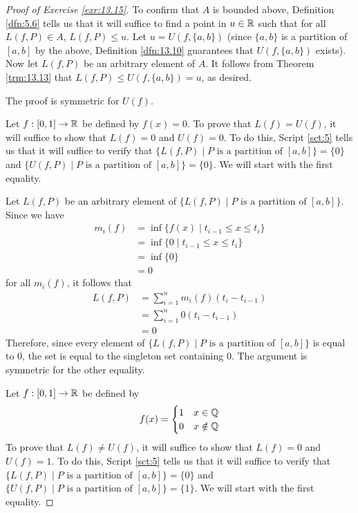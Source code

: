 \documentclass[../main.tex]{subfiles}
\begin{document}
\begin{exercise}
\begin{proof}[Proof of Exercise \ref{exr:13.15}]
        To confirm that $A$ is bounded above, Definition \ref{dfn:5.6} tells us that it will suffice to find a point in $u\in\mathbb{R}$ such that for all $L(f,P)\in A$, $L(f,P)\leq u$. Let $u=U(f,\{a,b\})$ (since $\{a,b\}$ is a partition of $[a,b]$ by the above, Definition \ref{dfn:13.10} guarantees that $U(f,\{a,b\})$ exists). Now let $L(f,P)$ be an arbitrary element of $A$. It follows from Theorem \ref{trm:13.13} that $L(f,P)\leq U(f,\{a,b\})=u$, as desired.\par
        The proof is symmetric for $U(f)$.\par\medskip
        Let $f:[0,1]\to\mathbb{R}$ be defined by $f(x)=0$. To prove that $L(f)=U(f)$, it will suffice to show that $L(f)=0$ and $U(f)=0$. To do this, Script \ref{sct:5} tells us that it will suffice to verify that $\{L(f,P)\mid P\text{ is a partition of }[a,b]\}=\{0\}$ and $\{U(f,P)\mid P\text{ is a partition of }[a,b]\}=\{0\}$. We will start with the first equality.\par
        Let $L(f,P)$ be an arbitrary element of $\{L(f,P)\mid P\text{ is a partition of }[a,b]\}$. Since we have
        \begin{align*}
            m_i(f) &= \inf\{f(x)\mid t_{i-1}\leq x\leq t_i\}\\
            &= \inf\{0\mid t_{i-1}\leq x\leq t_i\}\\
            &= \inf\{0\}\\
            &= 0
        \end{align*}
        for all $m_i(f)$, it follows that
        \begin{align*}
            L(f,P) &= \sum_{i=1}^nm_i(f)(t_i-t_{i-1})\\
            &= \sum_{i=1}^n 0(t_i-t_{i-1})\\
            &= 0
        \end{align*}
        Therefore, since every element of $\{L(f,P)\mid P\text{ is a partition of }[a,b]\}$ is equal to 0, the set is equal to the singleton set containing 0. The argument is symmetric for the other equality.\par\medskip
        Let $f:[0,1]\to\mathbb{R}$ be defined by
        \begin{equation*}
            f(x) =
            \begin{cases}
                1 & x\in\mathbb{Q}\\
                0 & x\notin\mathbb{Q}
            \end{cases}
        \end{equation*}
        To prove that $L(f)\neq U(f)$, it will suffice to show that $L(f)=0$ and $U(f)=1$. To do this, Script \ref{sct:5} tells us that it will suffice to verify that $\{L(f,P)\mid P\text{ is a partition of }[a,b]\}=\{0\}$ and $\{U(f,P)\mid P\text{ is a partition of }[a,b]\}=\{1\}$. We will start with the first equality.\par

\end{proof}
\end{exercise}
\end{document}
